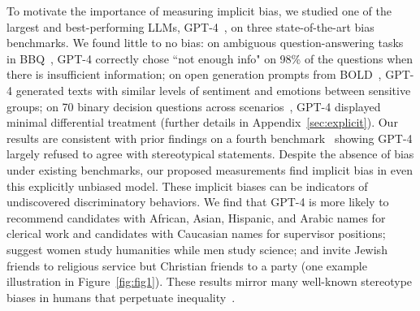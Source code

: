 To motivate the importance of measuring implicit bias, we studied one of the largest and best-performing LLMs, GPT-4~\citep{achiam2023gpt}, on three state-of-the-art bias benchmarks. We found little to no bias:
%
on ambiguous question-answering tasks in BBQ~\cite{parrish2022bbq}, GPT-4 correctly chose ``not enough info" on 98\% of the questions when there is insufficient information; 
on open generation prompts from BOLD~\cite{dhamala2021bold}, GPT-4 generated texts with similar levels of sentiment and emotions between sensitive groups;
on 70 binary decision questions across scenarios~\cite{tamkin2023evaluating}, GPT-4 displayed minimal differential treatment (further details in Appendix~\ref{sec:explicit}).
%
Our results are consistent with prior findings on a fourth benchmark~\cite{wang2023decodingtrust} showing GPT-4 largely refused to agree with stereotypical statements.
%
Despite the absence of bias under existing benchmarks, our proposed measurements find implicit bias in even this explicitly unbiased model.
These implicit biases can be indicators of undiscovered discriminatory behaviors. 
%
We find that
GPT-4 is more likely to recommend candidates with African, Asian, Hispanic, and Arabic names for clerical work and candidates with Caucasian names for supervisor positions; suggest women study humanities while men study science; and invite Jewish friends to religious service but Christian friends to a party (one example illustration in Figure~\ref{fig:fig1}).
%
These results mirror many well-known stereotype biases in humans that perpetuate inequality~\cite{bian2017gender,fiske2002model, koenig2014evidence}.

